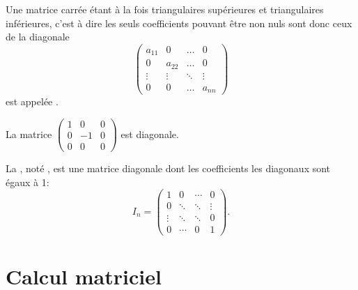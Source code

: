 \documentclass{book}
\begin{document}
\begin{Definition}
Une matrice carrée étant  à la fois triangulaires supérieures et triangulaires
inférieures, c'est à dire les seuls coefficients pouvant être non nuls sont donc ceux de la diagonale
$$
\begin{pmatrix}a _{11}&0&\dots &0\\0&a _{22}&\dots &0\\\vdots &\vdots &\ddots &\vdots \\0&0&\dots &a _{nn}\end{pmatrix}
$$
 est appelée .
\end{Definition}
\begin{Exemple}
La matrice $\begin{pmatrix}1&0&0\\0&-1&0\\0&0&0\end{pmatrix}$ est diagonale.
\end{Exemple}
\begin{Definition}
La , noté , est une matrice diagonale dont les coefficients les diagonaux sont égaux à 1: $$I_n=\begin{pmatrix}1&0&\cdots &0\\0&\ddots &\ddots &\vdots \\\vdots &\ddots &\ddots &0\\0&\cdots &0&1\end{pmatrix}.$$
\end{Definition}


\section{Calcul matriciel}
\end{document}
